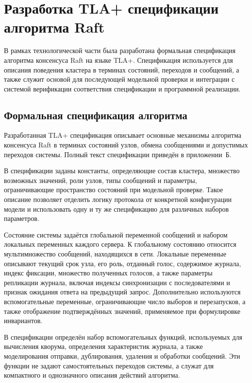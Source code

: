 \section{Разработка TLA+ спецификации алгоритма Raft}

В рамках технологической части была разработана формальная
спецификация алгоритма консенсуса Raft на языке TLA+. Спецификация
используется для описания поведения кластера в терминах состояний,
переходов и сообщений, а также служит основой для последующей
модельной проверки и интеграции с системой верификации соответствия
спецификации и программной реализации.

\subsection{Формальная спецификация алгоритма}

Разработанная TLA+ спецификация описывает основные механизмы
алгоритма консенсуса Raft в терминах состояний узлов, обмена
сообщениями и допустимых переходов системы. Полный текст
спецификации приведён в приложении~Б.

В спецификации заданы константы, определяющие состав кластера,
множество возможных значений, роли узлов, типы сообщений и
параметры, ограничивающие пространство состояний при модельной
проверке. Такое описание позволяет отделить логику протокола от
конкретной конфигурации модели и использовать одну и ту же
спецификацию для различных наборов параметров.

Состояние системы задаётся глобальной переменной сообщений и набором
локальных переменных каждого сервера. К глобальному состоянию
относится мультимножество сообщений, находящихся в сети. Локальные
переменные описывают текущий срок узла, его роль, отданный голос,
содержимое журнала, индекс фиксации, множество полученных голосов,
а также параметры репликации журнала, включая индексы
синхронизации с последователями и признак ожидания ответа на
предыдущий запрос. Дополнительно используются вспомогательные
переменные, ограничивающие число выборов и перезапусков, а также
отображение подтверждённых значений, применяемое при формулировке
инвариантов.

В спецификации определён набор вспомогательных функций,
используемых для вычисления кворума, определения характеристик
журнала, а также моделирования отправки, дублирования, удаления и
обработки сообщений. Эти функции не задают самостоятельных
переходов системы, а служат для компактного и однозначного
описания действий алгоритма.

